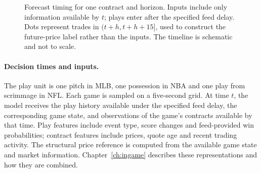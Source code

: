 \documentclass[12pt,a4paper,oneside]{report}
\begin{document}
\begin{figure}[htbp]
\centering
{}
\caption{Forecast timing for one contract and horizon. Inputs include only
information available by $t$; plays enter after the specified feed delay.
Dots represent trades in $(t+h,t+h+15]$, used to construct the future-price
label rather than the inputs. The timeline is schematic and not to scale.}
\label{fig:forecast-timeline}
\end{figure}

\paragraph{Decision times and inputs.}
The play unit is one pitch in MLB, one possession in NBA and one play from
scrimmage in NFL. Each game is sampled on a five-second grid. At time $t$, the model receives the
play history available under the specified feed delay, the corresponding game
state, and observations of the game's contracts available by that time. Play
features include event type, score changes and feed-provided win probabilities;
contract features include prices, quote age and recent trading activity. The
structural price reference is computed from the available game state and market
information. Chapter~\ref{ch:ingame} describes these representations and how they
are combined.
\end{document}
